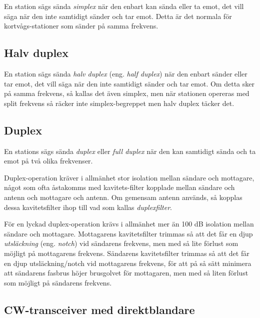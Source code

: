 En station sägs sända \emph{simplex} när den enbart kan sända eller ta emot,
det vill säga när den inte samtidigt sänder och tar emot.
Detta är det normala för kortvågs-stationer som sänder på samma frekvens.

\subsection{Halv duplex}

En station sägs sända \emph{halv duplex} (eng. \emph{half duplex}) när den
enbart sänder eller tar emot, det vill säga när den inte samtidigt sänder och tar emot.
Om detta sker på samma frekvens, så kallas det även simplex, men när stationen
opereras med split frekvens så räcker inte simplex-begreppet men halv duplex
täcker det.

\subsection{Duplex}

En stations sägs sända \emph{duplex} eller \emph{full duplex} när den kan
samtidigt sända och ta emot på två olika frekvenser.

Duplex-operation kräver i allmänhet stor isolation mellan sändare och mottagare,
något som ofta åstakomms med kavitets-filter kopplade mellan sändare och antenn
och mottagare och antenn.
Om gemensam antenn används, så kopplas dessa kavitetsfilter ihop till vad som
kallas \emph{duplexfilter}.

För en lyckad duplex-operation krävs i allmänhet mer än 100 dB isolation mellan
sändare och mottagare.
Mottagarens kavitetsfilter trimmas så att det får en djup \emph{utsläckning}
(eng. \emph{notch}) vid sändarens frekvens, men med så lite förlust som möjligt
på mottagarens frekvens.
Sändarens kavitetsfilter trimmas så att det får en djup utsläckning/notch vid
mottagarens frekvens, för att på så sätt minimera att sändarens fasbrus höjer
brusgolvet för mottagaren, men med så liten förlust som möjligt på sändarens
frekvens.

\subsection{CW-transceiver med direktblandare}

